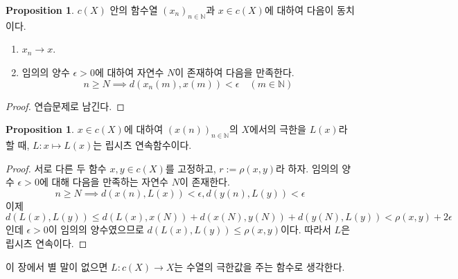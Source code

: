 \documentclass[11pt]{book}
\numberwithin{equation}{chapter}
\def\NN{\mathbb{N}}
\def\eps{\epsilon}
\theoremstyle{definition}
\newtheorem{prop}[thm]{Proposition}
\newenvironment{enum}
	{\begin{enumerate}[label=(\alph*), leftmargin=2\parindent]}
	{\end{enumerate}}
\begin{document}
\begin{prop}
    \(c(X)\) 안의 함수열 \((x_n)_{n \in \NN}\)과 \(x \in c(X)\)에 대하여 다음이 동치이다.
    \begin{enum}
        \item \(x_n \to x\).
        \item 임의의 양수 \(\eps > 0\)에 대하여 자연수 \(N\)이 존재하여 다음을 만족한다.
        \[
        n \ge N \implies d(x_n(m), x(m)) < \eps \quad (m \in \NN)    
        \]
    \end{enum}
\end{prop}
\begin{proof}
    연습문제로 남긴다.
\end{proof}

\begin{prop}
    \(x \in c(X)\)에 대하여 \((x(n))_{n \in \NN}\)의 \(X\)에서의 극한을 \(L(x)\)라 할 때, \(L : x \mapsto L(x)\)는 립시츠 연속함수이다.
\end{prop}
\begin{proof}
    서로 다른 두 함수 \(x, y \in c(X)\)를 고정하고, \(r := \rho(x, y)\)라 하자. 임의의 양수 \(\eps > 0\)에 대해 다음을 만족하는 자연수 \(N\)이 존재한다.
    \[
    n \ge N \implies d(x(n), L(x)) < \eps, d(y(n), L(y)) < \eps    
    \]
    이제
    \[
    d(L(x), L(y)) \le d(L(x), x(N)) + d(x(N), y(N)) + d(y(N), L(y)) < \rho(x, y) + 2\eps
    \]
    인데 \(\eps > 0\)이 임의의 양수였으므로 \(d(L(x), L(y)) \le \rho(x, y)\)이다. 따라서 \(L\)은 립시츠 연속이다.
\end{proof}

이 장에서 별 말이 없으면 \(L : c(X) \to X\)는 수열의 극한값을 주는 함수로 생각한다.
\end{document}
